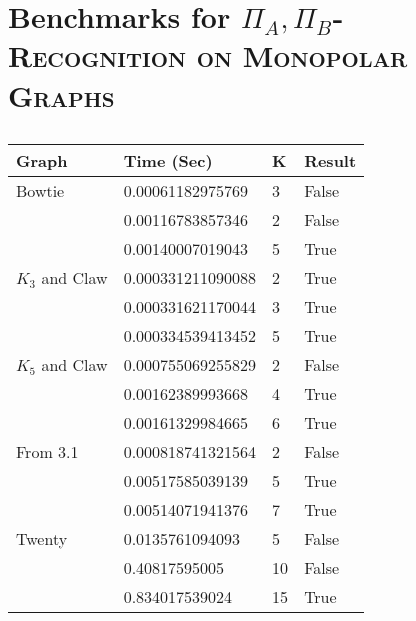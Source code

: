 \documentclass[11pt]{article}
\begin{document}
\section{Benchmarks for \textsc{\textsc{$\Pi_A,$$\Pi_B$-Recognition} on Monopolar Graphs}}
\label{subsec:structural} %

\subsection{}
\label{subsec:results} %

\begin{center}
    \begin{tabu} to 0.8\textwidth { | X[l] X[l] X[c] X[c] | }
        \hline
        Graph & Time (Sec) & K & Result \\
        [0.5ex]
        \hline
        \hline
Bowtie & 0.00061182975769 & 3 & False \\
[0.3ex]
 & 0.00116783857346 & 2 & False \\
 [0.3ex]
 & 0.00140007019043 & 5 & True \\
 [0.3ex]
 \hline
$K_3$ and Claw & 0.000331211090088 & 2 & True \\
[0.3ex]
 & 0.000331621170044 & 3 & True \\
 [0.3ex]
 & 0.000334539413452 & 5 & True \\
 [0.3ex]
 \hline
$K_5$ and Claw & 0.000755069255829 & 2 & False \\
[0.3ex]
\hline
 & 0.00162389993668 & 4 & True \\
 [0.3ex]
 & 0.00161329984665 & 6 & True \\
 [0.3ex]
 \hline
From 3.1 & 0.000818741321564 & 2 & False \\
[0.3ex]
 & 0.00517585039139 & 5 & True \\
 [0.3ex]
 & 0.00514071941376 & 7 & True \\
 [0.3ex]
 \hline
Twenty & 0.0135761094093 & 5 & False \\
[0.3ex]
 & 0.40817595005 & 10 & False \\
 [0.3ex]
 & 0.834017539024 & 15 & True \\
 [0.3ex]
 \hline
\end{tabu}
\end{center}

\subsection{}
\label{subsec:results} %
\end{document}
